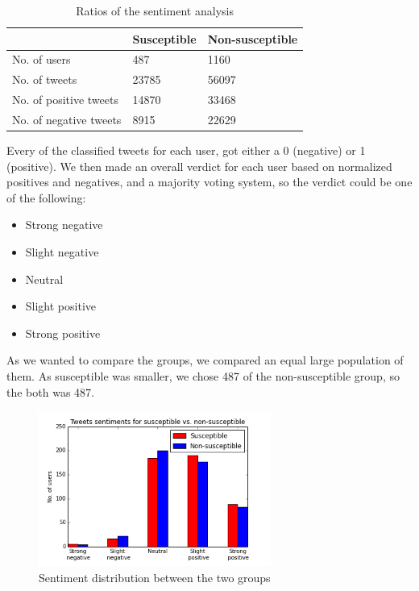 \documentclass[10pt]{IEEEtran}
\begin{document}
\begin{table}[H]
\centering
\begin{tabular}{lll}
\hline
                       & Susceptible & Non-susceptible \\ \hline
No. of users           & 487         & 1160   \\
No. of tweets          & 23785       & 56097   \\
No. of positive tweets & 14870       & 33468   \\
No. of negative tweets & 8915        & 22629   \\ \hline
\end{tabular}
\caption{Ratios of the sentiment analysis}
\label{tab:sentimentKeyNumbers}
\end{table}

Every of the classified tweets for each user, got either a 0 (negative) or 1 (positive). We then made an overall verdict for each user based on normalized positives and negatives, and a majority voting system, so the verdict could be one of the following:

\begin{itemize}
  \item Strong negative
  \item Slight negative
  \item Neutral
  \item Slight positive
  \item Strong positive\\
\end{itemize}

As we wanted to compare the groups, we compared an equal large population of them. As susceptible was smaller, we chose 487 of the non-susceptible group, so the both was 487.  \\

\begin{figure}[H]
  \centering
  \includegraphics[width=3.0in]{sentiment_barplot}
  \caption{Sentiment distribution between the two groups}
  \label{fig:sentiment_barplot}
\end{figure}
\end{document}
